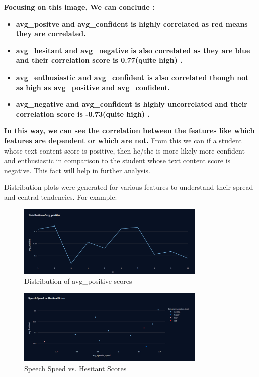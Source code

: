 \documentclass{article}
\begin{document}
\begin{tcolorbox}[colback=cyan!5!white,colframe=cyan!75!black,title= Insights from the correlation matrix]
\textbf{Focusing on this image, We can conclude :}
\begin{itemize}
    \item \textbf{avg\_positve and avg\_confident is highly correlated as red means they are correlated.}
    \item \textbf{avg\_hesitant and avg\_negative is also correlated as they are blue and their correlation score is 0.77(quite high) .}
    \item \textbf{avg\_enthusiastic and avg\_confident is also correlated though not as high as avg\_positive and avg\_confident.}
    \item \textbf{avg\_negative and avg\_confident is highly uncorrelated and their correlation score is -0.73(quite high) .}
\end{itemize}

\textbf{In this way, we can see the correlation between the features like which features are dependent or which are not.}
 From this we can if a student whose text content score is positive, then he/she is more likely more confident and enthusiastic
 in comparison to the student whose text content score is negative. This fact will help in further analysis.\\ 
    \vspace{0.2in}

\end{tcolorbox}


Distribution plots were generated for various features to understand their spread and central tendencies. For example:

\begin{figure}[H]
    \centering
    \includegraphics[width=0.8\textwidth]{images/avg_positve_distribution.png}
    \caption{Distribution of avg\_positive scores}
    \label{fig:avg_positive_distribution}
\end{figure}


\begin{figure}[H]
    \centering
    \includegraphics[width=0.8\textwidth]{images/speech_speed_vs_hesitant.png}
    \caption{Speech Speed vs. Hesitant Scores}
    \label{fig:speech_speed_vs_hesitant}
\end{figure}
\end{document}
